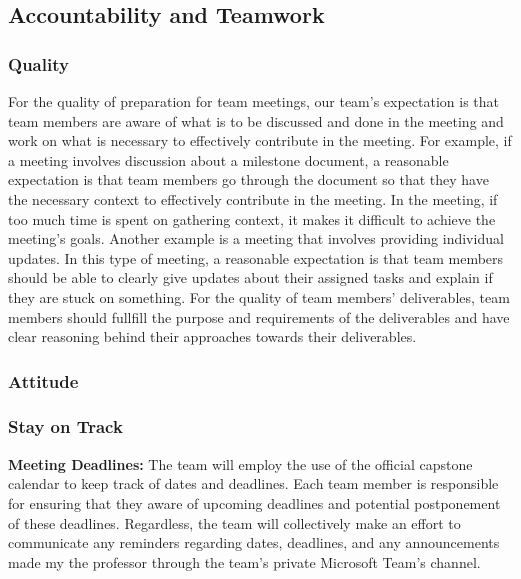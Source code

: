 \documentclass{article}
\begin{document}
\subsection*{Accountability and Teamwork}

\subsubsection*{Quality} 
For the quality of preparation for team meetings, our team's expectation is that team members
are aware of what is to be discussed and done in the meeting and work on what is necessary to effectively contribute
in the meeting. For example, if a meeting involves discussion about a milestone document, a reasonable expectation is that team members
go through the document so that they have the necessary context to effectively contribute
in the meeting. In the meeting, if too much time is spent on gathering context, it makes it
difficult to achieve the meeting's goals. Another example is a meeting that involves providing 
individual updates. In this type of meeting, a reasonable expectation is that team members should be able to
clearly give updates about their assigned tasks and explain if they are stuck on something. For the quality of team members' deliverables,
team members should fullfill the purpose and requirements of the deliverables and have clear reasoning behind
their approaches towards their deliverables.


\subsubsection*{Attitude}


\subsubsection*{Stay on Track}

\noindent\textbf{Meeting Deadlines:} The team will employ the use of the official capstone calendar to keep track of dates and deadlines. Each team member is responsible for ensuring that they aware of
upcoming deadlines and potential postponement of these deadlines. Regardless, the team will collectively make an effort to communicate any reminders regarding dates, deadlines,
and any announcements made my the professor through the team's private Microsoft Team's channel. \\
\end{document}
